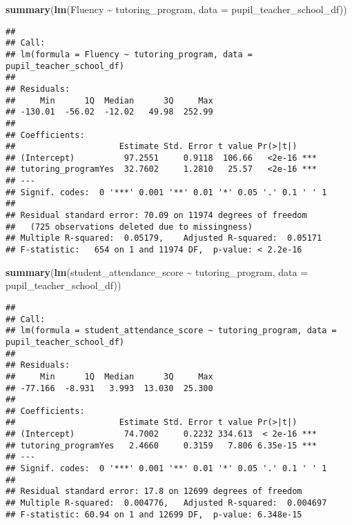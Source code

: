 \documentclass[
]{article}
\newenvironment{Shaded}{\begin{snugshade}}{\end{snugshade}}
\newcommand{\AttributeTok}[1]{\textcolor[rgb]{0.13,0.29,0.53}{#1}}
\newcommand{\FunctionTok}[1]{\textcolor[rgb]{0.13,0.29,0.53}{\textbf{#1}}}
\newcommand{\NormalTok}[1]{#1}
\newcommand{\SpecialCharTok}[1]{\textcolor[rgb]{0.81,0.36,0.00}{\textbf{#1}}}
\begin{document}
\begin{Shaded}
\begin{Highlighting}[]
\FunctionTok{summary}\NormalTok{(}\FunctionTok{lm}\NormalTok{(Fluency }\SpecialCharTok{\textasciitilde{}}\NormalTok{ tutoring\_program, }\AttributeTok{data =}\NormalTok{ pupil\_teacher\_school\_df))}
\end{Highlighting}
\end{Shaded}

\begin{verbatim}
## 
## Call:
## lm(formula = Fluency ~ tutoring_program, data = pupil_teacher_school_df)
## 
## Residuals:
##     Min      1Q  Median      3Q     Max 
## -130.01  -56.02  -12.02   49.98  252.99 
## 
## Coefficients:
##                     Estimate Std. Error t value Pr(>|t|)    
## (Intercept)          97.2551     0.9118  106.66   <2e-16 ***
## tutoring_programYes  32.7602     1.2810   25.57   <2e-16 ***
## ---
## Signif. codes:  0 '***' 0.001 '**' 0.01 '*' 0.05 '.' 0.1 ' ' 1
## 
## Residual standard error: 70.09 on 11974 degrees of freedom
##   (725 observations deleted due to missingness)
## Multiple R-squared:  0.05179,    Adjusted R-squared:  0.05171 
## F-statistic:   654 on 1 and 11974 DF,  p-value: < 2.2e-16
\end{verbatim}

\begin{Shaded}
\begin{Highlighting}[]
\FunctionTok{summary}\NormalTok{(}\FunctionTok{lm}\NormalTok{(student\_attendance\_score }\SpecialCharTok{\textasciitilde{}}\NormalTok{ tutoring\_program, }\AttributeTok{data =}\NormalTok{ pupil\_teacher\_school\_df))}
\end{Highlighting}
\end{Shaded}

\begin{verbatim}
## 
## Call:
## lm(formula = student_attendance_score ~ tutoring_program, data = pupil_teacher_school_df)
## 
## Residuals:
##     Min      1Q  Median      3Q     Max 
## -77.166  -8.931   3.993  13.030  25.300 
## 
## Coefficients:
##                     Estimate Std. Error t value Pr(>|t|)    
## (Intercept)          74.7002     0.2232 334.613  < 2e-16 ***
## tutoring_programYes   2.4660     0.3159   7.806 6.35e-15 ***
## ---
## Signif. codes:  0 '***' 0.001 '**' 0.01 '*' 0.05 '.' 0.1 ' ' 1
## 
## Residual standard error: 17.8 on 12699 degrees of freedom
## Multiple R-squared:  0.004776,   Adjusted R-squared:  0.004697 
## F-statistic: 60.94 on 1 and 12699 DF,  p-value: 6.348e-15
\end{verbatim}
\end{document}
